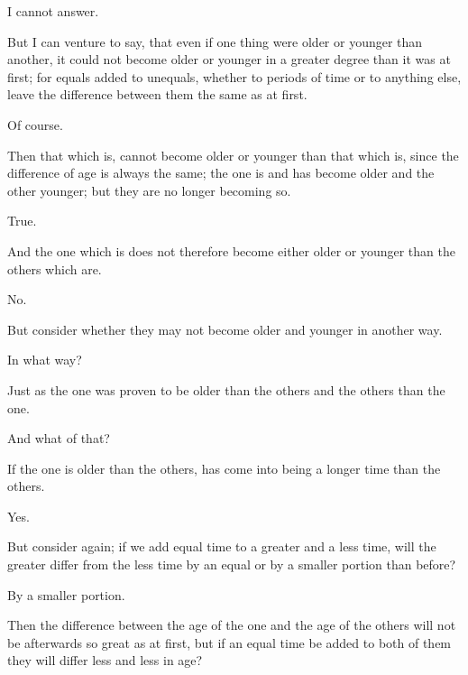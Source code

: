 \documentclass[11pt,letter]{article}
\begin{document}
\par  I cannot answer.

\par  But I can venture to say, that even if one thing were older or younger than another, it could not become older or younger in a greater degree than it was at first; for equals added to unequals, whether to periods of time or to anything else, leave the difference between them the same as at first.

\par  Of course.

\par  Then that which is, cannot become older or younger than that which is, since the difference of age is always the same; the one is and has become older and the other younger; but they are no longer becoming so.

\par  True.

\par  And the one which is does not therefore become either older or younger than the others which are.

\par  No.

\par  But consider whether they may not become older and younger in another way.

\par  In what way?

\par  Just as the one was proven to be older than the others and the others than the one.

\par  And what of that?

\par  If the one is older than the others, has come into being a longer time than the others.

\par  Yes.

\par  But consider again; if we add equal time to a greater and a less time, will the greater differ from the less time by an equal or by a smaller portion than before?

\par  By a smaller portion.

\par  Then the difference between the age of the one and the age of the others will not be afterwards so great as at first, but if an equal time be added to both of them they will differ less and less in age?
\end{document}
